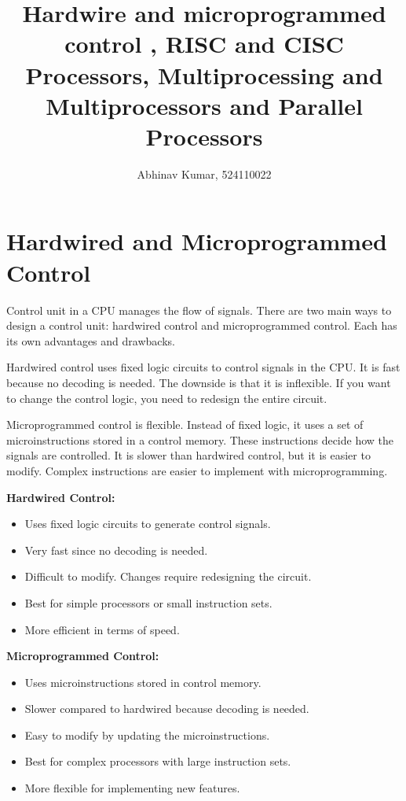 \documentclass[12pt]{article}
\title{ Hardwire and microprogrammed control , RISC and CISC Processors, Multiprocessing and Multiprocessors and Parallel Processors}
\author{Abhinav Kumar, 524110022}
\begin{document}
\maketitle
\newpage
\section*{Hardwired and Microprogrammed Control}
Control unit in a CPU manages the flow of signals. There are two main ways to design a control unit: hardwired control and microprogrammed control. Each has its own advantages and drawbacks. 

Hardwired control uses fixed logic circuits to control signals in the CPU. It is fast because no decoding is needed. The downside is that it is inflexible. If you want to change the control logic, you need to redesign the entire circuit.

Microprogrammed control is flexible. Instead of fixed logic, it uses a set of microinstructions stored in a control memory. These instructions decide how the signals are controlled. It is slower than hardwired control, but it is easier to modify. Complex instructions are easier to implement with microprogramming.


\begin{multicols}{2}
    \textbf{Hardwired Control:}
    \begin{itemize}
        \item Uses fixed logic circuits to generate control signals.
        \item Very fast since no decoding is needed.
        \item Difficult to modify. Changes require redesigning the circuit.
        \item Best for simple processors or small instruction sets.
        \item More efficient in terms of speed.
    \end{itemize}
    
    \columnbreak
    
    \textbf{Microprogrammed Control:}
    \begin{itemize}
        \item Uses microinstructions stored in control memory.
        \item Slower compared to hardwired because decoding is needed.
        \item Easy to modify by updating the microinstructions.
        \item Best for complex processors with large instruction sets.
        \item More flexible for implementing new features.
    \end{itemize}
\end{multicols}
\newpage
\end{document}
